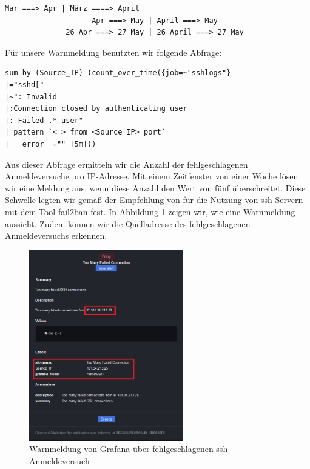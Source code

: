 \begin{center}
{
\begin{Verbatim}[frame=single,fontsize=\small]
                    Mar ===> Apr | März ====> April
                    Apr ===> May | April ===> May
              26 Apr ===> 27 May | 26 April ===> 27 May
\end{Verbatim}
}
\end{center}

Für unsere Warnmeldung benutzten wir folgende Abfrage:
\begin{center}
{
\begin{Verbatim}[frame=single,fontsize=\small]
sum by (Source_IP) (count_over_time({job=~"sshlogs"} 
|="sshd[" 
|~": Invalid
|:Connection closed by authenticating user
|: Failed .* user" 
| pattern `<_> from <Source_IP> port` 
| __error__="" [5m]))
\end{Verbatim}
}
\end{center}

Aus dieser Abfrage ermitteln wir die Anzahl der fehlgeschlagenen Anmeldeversuche pro IP-Adresse. Mit einem Zeitfenster von einer Woche lösen wir eine Meldung aus, wenn diese Anzahl den Wert von fünf überschreitet. Diese Schwelle legten wir gemäß der Empfehlung von \cite{RedHat_Passwort} für die Nutzung von \gls{ssh}-Servern mit dem Tool \gls{fail2ban} fest. In Abbildung \ref{fig:unsereWarnmeldung1} zeigen wir, wie eine Warnmeldung aussieht. Zudem können wir die Quelladresse des fehlgeschlagenen Anmeldeversuchs erkennen.

\begin{figure}[H]
  \centering
  \includegraphics[width=0.6\textwidth]{assets/OurAlert.png}
  \caption[Warnmeldung von Grafana über fehlgeschlagenen \gls{ssh}-Anmeldeversuch]
  {Warnmeldung von Grafana über fehlgeschlagenen \gls{ssh}-Anmeldeversuch}
  \centering
  \label{fig:unsereWarnmeldung1}
\end{figure}


